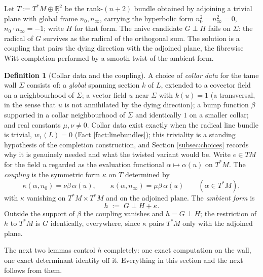 \documentclass[11pt]{article}
\theoremstyle{definition}
\newtheorem{definition}[theorem]{Definition}
\newcommand{\R}{\mathbb{R}}
\newcommand{\shL}{L}
\newcommand{\Sig}{\Sigma}
\newcommand{\nO}{n_0}
\newcommand{\nInf}{n_\infty}
\begin{document}
Let $T := T^*M \oplus \underline{\R}^2$ be the rank-$(n{+}2)$ bundle obtained by adjoining a trivial plane with global frame $\nO, \nInf$, carrying the hyperbolic form $\nO^2 = \nInf^2 = 0$, $\nO \cdot \nInf = -1$; write $H$ for that form. The naive candidate $G \perp H$ fails on $\Sig$: the radical of $G$ survives as the radical of the orthogonal sum. The solution is a coupling that pairs the dying direction with the adjoined plane, the fibrewise Witt completion performed by a smooth twist of the ambient form.

\begin{definition}[Collar data and the coupling]\label{def:coupling}
A choice of \emph{collar data} for the tame wall $\Sig$ consists of: a \emph{global} spanning section $k$ of $\shL$, extended to a covector field on a neighbourhood of $\Sig$; a vector field $u$ near $\Sig$ with $k(u) = 1$ (a transversal, in the sense that $u$ is not annihilated by the dying direction); a bump function $\beta$ supported in a collar neighbourhood of $\Sig$ and identically $1$ on a smaller collar; and real constants $\mu, \nu \neq 0$. Collar data exist exactly when the radical line bundle is trivial, $w_1(\shL) = 0$ (Fact \ref{fact:linebundles}); this triviality is a standing hypothesis of the completion construction, and Section \ref{subsec:choices} records why it is genuinely needed and what the twisted variant would be. Write $e \in TM$ for the field $u$ regarded as the evaluation functional $\alpha \mapsto \alpha(u)$ on $T^*M$. The \emph{coupling} is the symmetric form $\kappa$ on $T$ determined by
\[
\kappa(\alpha, \nO) = \nu\beta\,\alpha(u), \qquad \kappa(\alpha, \nInf) = \mu\beta\,\alpha(u) \qquad (\alpha \in T^*M),
\]
with $\kappa$ vanishing on $T^*M \times T^*M$ and on the adjoined plane. The \emph{ambient form} is
\[
h \;:=\; G \perp H + \kappa .
\]
Outside the support of $\beta$ the coupling vanishes and $h = G \perp H$; the restriction of $h$ to $T^*M$ is $G$ identically, everywhere, since $\kappa$ pairs $T^*M$ only with the adjoined plane.
\end{definition}

The next two lemmas control $h$ completely: one exact computation on the wall, one exact determinant identity off it. Everything in this section and the next follows from them.
\end{document}
